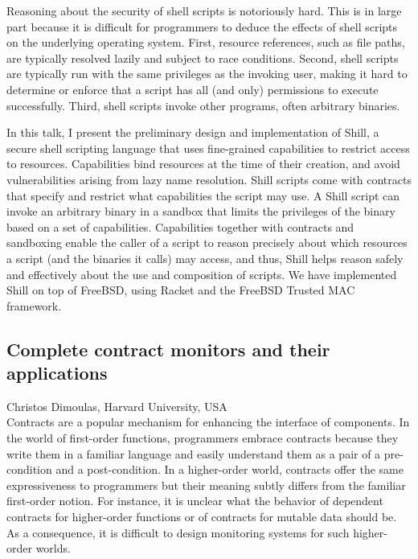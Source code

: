 \documentclass[11pt]{article}
\begin{document}
Reasoning about the security of shell scripts is notoriously
hard. This is in large part because it is difficult for programmers to
deduce the effects of shell scripts on the underlying operating
system. First, resource references, such as file paths, are typically
resolved lazily and subject to race conditions.  Second, shell scripts
are typically run with the same privileges as the invoking user,
making it hard to determine or enforce that a script has all (and
only) permissions to execute successfully. Third, shell scripts invoke
other programs, often arbitrary binaries.

In this talk, I present the preliminary design and implementation of
Shill, a secure shell scripting language that uses fine-grained
capabilities to restrict access to resources. Capabilities bind
resources at the time of their creation, and avoid vulnerabilities
arising from lazy name resolution. Shill scripts come with contracts
that specify and restrict what capabilities the script may use. A
Shill script can invoke an arbitrary binary in a sandbox that limits
the privileges of the binary based on a set of
capabilities. Capabilities together with contracts and sandboxing
enable the caller of a script to reason precisely about which
resources a script (and the binaries it calls) may access, and thus,
Shill helps reason safely and effectively about the use and
composition of scripts. We have implemented Shill on top of FreeBSD,
using Racket and the FreeBSD Trusted MAC framework.

\subsection*{Complete contract monitors and their applications}
\noindent Christos Dimoulas, Harvard University, USA \\[0.5ex]

Contracts are a popular mechanism for enhancing the interface of
components. In the world of first-order functions, programmers embrace
contracts because they write them in a familiar language and easily
understand them as a pair of a pre-condition and a post-condition. In
a higher-order world, contracts offer the same expressiveness to
programmers but their meaning subtly differs from the familiar
first-order notion. For instance, it is unclear what the behavior of
dependent contracts for higher-order functions or of contracts for
mutable data should be. As a consequence, it is difficult to design
monitoring systems for such higher-order worlds.
\end{document}
